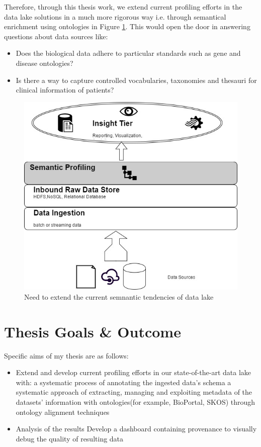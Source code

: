 Therefore, through this thesis work, we extend current profiling efforts in the data lake solutions in a much more rigorous way i.e. through semantical enrichment using ontologies in Figure \ref{fig:Figure1}. This would open the door in answering questions about data sources like: 
\begin{itemize}
	\item Does the biological data adhere to particular standards such as gene and disease ontologies?
	\item  Is there a way to capture controlled vocabularies, taxonomies and thesauri for clinical information of patients?
\end{itemize}
\begin{figure}[htbp]
	\centering
	
	\includegraphics[scale=0.3]{./images/datalake.JPG}
	\caption{Need to extend the current semnantic tendencies of data lake}
	\label{fig:Figure1}
\end{figure} \newpage
\section{Thesis Goals \& Outcome}
\label{goals}
Specific aims of my thesis are as follows:
\begin{itemize}
	\item Extend and develop current profiling efforts in our state-of-the-art data lake with:
	 a systematic process of annotating the ingested data's schema\cite{bernstein2011generic}
	 a systematic approach of extracting, managing and exploiting metadata of the datasets' information with  ontologies(for example, BioPortal, SKOS) through ontology alignment techniques\cite{romero2009ontology}
 \item Analysis of the results
  Develop a dashboard containing provenance to visually debug the quality of resulting data
\end{itemize}
